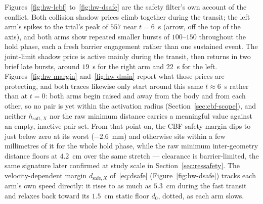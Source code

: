 \documentclass[12pt,a4paper,twoside,openright]{report}
\begin{document}
Figures~\ref{fig:hw-lcbf} to~\ref{fig:hw-dsafe} are the safety filter's own account of the conflict. Both collision shadow prices climb together during the transit; the left arm's spikes to the trial's peak of $557$ near $t=6$~s (arrow, off the top of the axis), and both arms show repeated smaller bursts of $100$--$150$ throughout the hold phase, each a fresh barrier engagement rather than one sustained event. The joint-limit shadow price is active mainly during the transit, then returns in two brief late bursts, around $19$~s for the right arm and $22$~s for the left. Figures~\ref{fig:hw-margin} and~\ref{fig:hw-dmin} report what those prices are protecting, and both traces likewise only start around this same $t\approx6$~s rather than at $t=0$: both arms begin raised and away from the body and from each other, so no pair is yet within the activation radius (Section~\ref{sec:cbf-scope}), and neither $h_{\text{soft},X}$ nor the raw minimum distance carries a meaningful value against an empty, inactive pair set. From that point on, the CBF safety margin dips to just below zero at its worst ($-2.6$~mm) and otherwise sits within a few millimetres of it for the whole hold phase, while the raw minimum inter-geometry distance floors at $4.2$~cm over the same stretch --- clearance is barrier-limited, the same signature later confirmed at study scale in Section~\ref{sec:ressafety}. The velocity-dependent margin $d_{\text{safe},X}$ of~\eqref{eq:dsafe} (Figure~\ref{fig:hw-dsafe}) tracks each arm's own speed directly: it rises to as much as $5.3$~cm during the fast transit and relaxes back toward its $1.5$~cm static floor $d_0$, dotted, as each arm slows.
\end{document}
